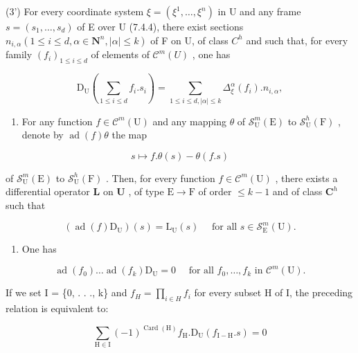 (3') For every coordinate system \(\xi = (\xi^1, \ldots, \xi^n)\) in U and any frame \(s = (s_1, \ldots, s_d)\) of E over U (7.4.4), there exist sections \(n_{i,\alpha}(1 \leqslant i \leqslant d, \alpha \in \mathbf{N}^n, |\alpha| \leqslant k)\) of F on U, of class \(C^h\) and such that, for every family \((f_i)_{1 \leqslant i \leqslant d}\) of elements of \(\mathcal{C}^m(U)\) , one has

\[
\mathrm{D} _ {\mathrm{U}} \left(\sum_ {1 \leqslant i \leqslant d} f _ {i}. s _ {i}\right) = \sum_ {1 \leqslant i \leqslant d, | \alpha | \leqslant k} \Delta_ {\xi} ^ {\alpha} (f _ {i}). n _ {i, \alpha},
\]

\begin{enumerate}
\def\labelenumi{(\arabic{enumi})}
\setcounter{enumi}{3}
\tightlist
\item
  For any function \(f \in \mathcal{C}^m(\mathrm{U})\) and any mapping \(\theta\) of \(\mathcal{S}_{\mathrm{U}}^{m}(\mathrm{E})\) to \(\mathcal{S}_{\mathrm{U}}^{h}(\mathrm{F})\) , denote by \(\operatorname{ad}(f)\theta\) the map
\end{enumerate}

\[
s \mapsto f. \theta (s) - \theta (f. s)
\]

of \(\mathcal{S}_{\mathrm{U}}^{m}(\mathrm{E})\) to \(\mathcal{S}_{\mathrm{U}}^{h}(\mathrm{F})\) . Then, for every function \(f \in \mathcal{C}^{m}(\mathrm{U})\) , there exists a differential operator \(\mathbf{L}\) on \(\mathbf{U}\) , of type \(\mathrm{E} \to \mathrm{F}\) of order \(\leqslant k - 1\) and of class \(\mathbf{C}^{h}\) such that

\[
(\operatorname{ad} (f) \mathrm{D} _ {\mathrm{U}}) (s) = \mathrm{L} _{\mathrm{U}}(s) \quad \text { for all } s \in \mathscr{S}_{\mathrm{E}}^{m}(\mathrm{U}).
\]

\begin{enumerate}
\def\labelenumi{(\arabic{enumi})}
\setcounter{enumi}{4}
\tightlist
\item
  One has
\end{enumerate}

\[
\operatorname{ad} (f _ {0}) \dots \operatorname{ad} (f _ {k}) \mathrm{D} _ {\mathrm{U}} = 0 \quad \text { for all } f _ {0}, \dots , f _ {k} \text { in } \mathscr {C} ^ {m} (\mathrm{U}).
\]

If we set I = \{0, . . ., k\} and \(f_{H} = \prod_{i \in H} f_i\) for every subset H of I, the preceding relation is equivalent to:

\[
\sum_ {\mathrm{H} \in \mathrm{I}} (- 1) ^ {\operatorname{Card} (\mathrm{H})} f _ {\mathrm{H}}. \mathrm{D} _ {\mathrm{U}} (f _ {\mathrm{I-H}}. s) = 0
\]

